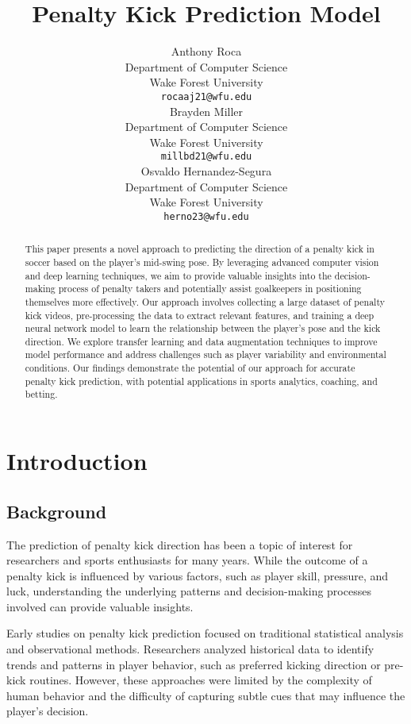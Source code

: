 \documentclass{article}
\title{Penalty Kick Prediction Model}
\author{%
    Anthony Roca\\
    Department of Computer Science\\
    Wake Forest University\\
    \texttt{rocaaj21@wfu.edu} \\
    \AND 
    Brayden Miller\\
    Department of Computer Science\\
    Wake Forest University\\
    \texttt{millbd21@wfu.edu} \\
    \AND
    Osvaldo Hernandez-Segura\\
    Department of Computer Science\\
    Wake Forest University\\
    \texttt{herno23@wfu.edu} \\  
}
\begin{document}
\maketitle

\begin{abstract} 
  
  This paper presents a novel approach to predicting the direction of a penalty kick in soccer based on the player's mid-swing pose. By leveraging advanced computer vision and deep learning techniques, we aim to provide valuable insights into the decision-making process of penalty takers and potentially assist goalkeepers in positioning themselves more effectively. Our approach involves collecting a large dataset of penalty kick videos, pre-processing the data to extract relevant features, and training a deep neural network model to learn the relationship between the player's pose and the kick direction. We explore transfer learning and data augmentation techniques to improve model performance and address challenges such as player variability and environmental conditions. Our findings demonstrate the potential of our approach for accurate penalty kick prediction, with potential applications in sports analytics, coaching, and betting.
\end{abstract}


\section{Introduction}

\subsection{Background}

The prediction of penalty kick direction has been a topic of interest for researchers and sports enthusiasts for many years. While the outcome of a penalty kick is influenced by various factors, such as player skill, pressure, and luck, understanding the underlying patterns and decision-making processes involved can provide valuable insights.

Early studies on penalty kick prediction focused on traditional statistical analysis and observational methods. Researchers analyzed historical data to identify trends and patterns in player behavior, such as preferred kicking direction or pre-kick routines. However, these approaches were limited by the complexity of human behavior and the difficulty of capturing subtle cues that may influence the player's decision.
\end{document}

